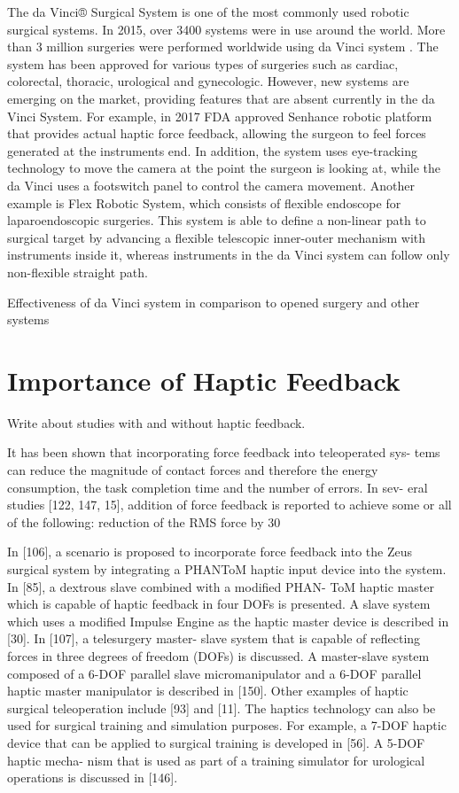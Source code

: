 The da Vinci® Surgical System is one of the most commonly used robotic surgical systems. In 2015, over 3400 systems were in use around the world. More than 3 million surgeries were performed worldwide using da Vinci system \cite{_intuitive_2018}. The system has been approved for various types of surgeries such as cardiac, colorectal, thoracic, urological and gynecologic. However, new systems are emerging on the market, providing features that are absent currently in the da Vinci System. For example, in 2017 FDA approved Senhance robotic platform that provides actual haptic force feedback, allowing the surgeon to feel forces generated at the instruments end. In addition, the system uses eye-tracking technology to move the camera at the point the surgeon is looking at, while the da Vinci uses a footswitch panel to control the camera movement. Another example is Flex Robotic System, which consists of flexible endoscope for laparoendoscopic surgeries. This system is able to define a non-linear path to surgical target by advancing a flexible telescopic inner-outer mechanism with instruments inside it, whereas instruments in the da Vinci system can follow only non-flexible straight path. \cite{peters_review_2018}


Effectiveness of da Vinci system in comparison to opened surgery and other systems \cite{yu_safety_2014}



\section{Importance of Haptic Feedback}
\label{sec:hapticFeedbackImportance}
Write about studies with and without haptic feedback.

It has been shown that incorporating force feedback into teleoperated sys- tems can reduce the magnitude of contact forces and therefore the energy consumption, the task completion time and the number of errors. In sev- eral studies [122, 147, 15], addition of force feedback is reported to achieve some or all of the following: reduction of the RMS force by 30%

In [106], a scenario is proposed to incorporate force feedback into the Zeus surgical system by integrating a PHANToM haptic input device into the system. In [85], a dextrous slave combined with a modified PHAN- ToM haptic master which is capable of haptic feedback in four DOFs is presented. A slave system which uses a modified Impulse Engine as the haptic master device is described in [30]. In [107], a telesurgery master- slave system that is capable of reflecting forces in three degrees of freedom (DOFs) is discussed. A master-slave system composed of a 6-DOF parallel slave micromanipulator and a 6-DOF parallel haptic master manipulator is described in [150]. Other examples of haptic surgical teleoperation include [93] and [11]. The haptics technology can also be used for surgical training and simulation purposes. For example, a 7-DOF haptic device that can be applied to surgical training is developed in [56]. A 5-DOF haptic mecha- nism that is used as part of a training simulator for urological operations is discussed in [146]. 


